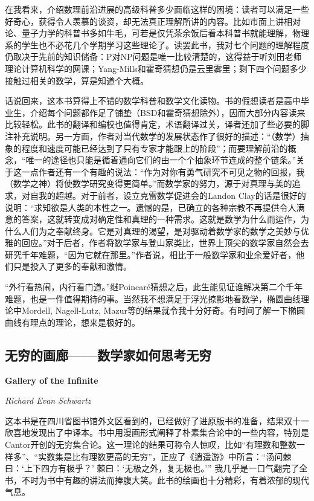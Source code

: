 \par 在我看来，介绍数理前沿进展的高级科普多少面临这样的困境：读者可以满足一些好奇心，获得令人羡慕的谈资，却无法真正理解所讲的内容。比如市面上讲相对论、量子力学的科普书多如牛毛，可若是仅凭茶余饭后看本科普书就能理解，物理系的学生也不必花几个学期学习这些理论了。读罢此书，我对七个问题的理解程度仍取决于先前的知识储备：P对NP问题是唯一比较清楚的，这得益于听刘田老师理论计算机科学的网课；Yang-Mills和霍奇猜想仍是云里雾里；剩下四个问题多少接触过相关的数学，算是知道个大概。
\par 话说回来，这本书算得上不错的数学科普和数学文化读物。书的假想读者是高中毕业生，介绍每个问题都作足了铺垫（BSD和霍奇猜想除外），因而大部分内容读来比较轻松。此书的翻译和编校也值得肯定，术语翻译过关，译者还加了些必要的脚注补充说明。另一方面，作者对当代数学的发展状态作了很好的描述：“（数学）抽象的程度和速度可能已经达到了只有专家才能跟上的阶段”；而要理解前沿的概念，“唯一的途径也只能是循着通向它们的由一个个抽象环节连成的整个链条。”关于这一点作者还有一个有趣的说法：“作为对你有勇气研究不可见之物的回报，我（数学之神）将使数学研究变得更简单。”而数学家的努力，源于对真理与美的追求，对自我的超越。对于前者，设立克雷数学促进会的Landon Clay的话是很好的说明：“求知欲是人类的本性之一。遗憾的是，已确立的各种宗教不再提供令人满意的答案，这就转变成对确定性和真理的一种需求。这就是数学为什么而运作，为什么人们为之奉献终身。它是对真理的渴望，是对驱动着数学家的数学之美妙与优雅的回应。”对于后者，作者将数学家与登山家类比，世界上顶尖的数学家自然会去研究千年难题，“因为它就在那里。”作者说，相比于一般数学家和业余爱好者，他们只是投入了更多的奉献和激情。
\par “外行看热闹，内行看门道。”继Poincaré猜想之后，此生能见证谁解决第二个千年难题，也是一件值得期待的事。当然我不想满足于浮光掠影地看数学，椭圆曲线理论中Mordell, Nagell-Lutz, Mazur等的结果就令我十分好奇。有时间了解一下椭圆曲线有理点的理论，想来是极好的。
\par {}



\subsection*{无穷的画廊——数学家如何思考无穷}
\par \textbf{Gallery of the Infinite}
\par \emph{Richard Evan Schwartz} 
\par 这本书是在四川省图书馆外文区看到的，已经做好了进原版书的准备，结果双十一欣喜地发现出了中译本。书中用漫画形式阐释了朴素集合论中的一些内容，特别是Cantor开创的无穷集合论。这一理论的结果可称令人惊叹，比如“有理数和整数一样多”、“实数集是比有理数更高的无穷”，正应了《逍遥游》中所言：“汤问棘曰：‘上下四方有极乎？’ 棘曰：‘无极之外，复无极也。’” 我几乎是一口气翻完了全书，不时为书中有趣的讲法而捧腹大笑。此书的绘画也十分精彩，有着浓郁的现代气息。
\par {}

